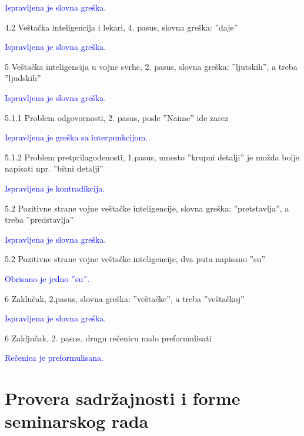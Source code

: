 \documentclass[a4paper]{report}
\newcommand{\odgovor}[1]{\textcolor{blue}{#1}}
\begin{document}
\odgovor{Ispravljena je slovna greška.}

4.2 Veštačka inteligencija i lekari, 4. pasus, slovna greška: ''daje''

\odgovor{Ispravljena je slovna greška.}

5 Veštačka inteligencija u vojne svrhe, 2. pasus, slovna greška: ''ljutskih'', a treba ''ljudskih''

\odgovor{Ispravljena je slovna greška.}

5.1.1 Problem odgovornosti, 2. pasus, posle ''Naime'' ide zarez

\odgovor{Ispravljena je greška sa interpunkcijom.}

5.1.2 Problem pretprilagođenosti, 1.pasus, umesto ''krupni detalji'' je možda bolje napisati npr. ''bitni detalji''

\odgovor{Ispravljena je kontradikcija.}

5.2 Pozitivne strane vojne veštačke inteligencije, slovna greška: ''pretstavlja'', a treba ''predstavlja''

\odgovor{Ispravljena je slovna greška.}

5.2 Pozitivne strane vojne veštačke inteligencije, dva puta napisano ''su''

\odgovor{Obrisano je jedno ˝su˝.}

6 Zaklučak, 2.pasus, slovna greška: ''veštačke'', a treba ''veštačkoj''

\odgovor{Ispravljena je slovna greška.}

6 Zaključak, 2. pasus, drugu rečenicu malo preformulisati

\odgovor{Rečenica je preformulisana.}

\section{Provera sadržajnosti i forme seminarskog rada}
\end{document}
